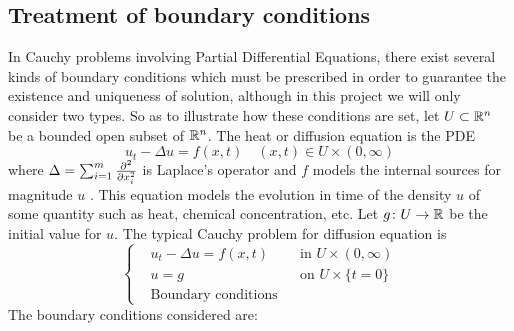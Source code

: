 \subsection{Treatment of boundary conditions}

In Cauchy problems involving Partial Differential Equations, there exist
several kinds of boundary conditions which must be prescribed in order to
guarantee the existence and uniqueness of solution, although in this project
we will only consider two types. So as to illustrate how these conditions are set,
let $U \subset \mathbb{R}^n$ be a bounded open subset of $\mathbb{R}^n$. The heat or diffusion
equation is the PDE
\begin{equation} \label{eq:boundary_conditions_heat_equation}
	u_t - \Delta u = f(x, t) \quad (x, t) \in U \times (0,\infty)
\end{equation}
where $\Delta = \sum_{i=1}^{m} \pdv[2]{}{x_i}$ is Laplace's operator and $f$
models the internal sources for magnitude $u$ \cite{evans1998pde}. This equation models the
evolution in time of the density $u$ of some quantity such as heat, chemical
concentration, etc. Let $g \colon U \rightarrow \mathbb{R}$ be the
initial value for $u$. The typical Cauchy problem for diffusion equation is
\begin{equation} \label{eq:boundary_conditions_problem}
	\left\{
	\begin{aligned}
		&u_t - \Delta u = f(x, t) & &\text{in } U \times (0,\infty) \\
		&u = g & &\text{on } U \times \{ t = 0 \} \\
		&\text{Boundary conditions}
	\end{aligned}
	\right.
\end{equation}
The boundary conditions considered are:
